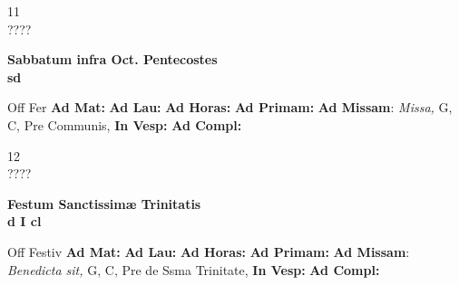\documentclass[10pt, openany]{book}
\begin{document}
    \begin{center}
        \begin{minipage}{3.5in}
            \vspace{2em}
            \begin{minipage}{0.5in}
                {\Huge 11} \\
                {\normalsize ????}
            \end{minipage}
            \begin{minipage}{3.0in}
                \textbf{ \large Sabbatum infra Oct. Pentecostes \\
                \textnormal{\normalsize sd}}

            \end{minipage}
            \begin{justify}Off Fer
                \textbf{Ad Mat: }
                \textbf{Ad Lau: }
                \textbf{Ad Horas: }
                \textbf{Ad Primam: }\textbf{Ad Missam}: \textit{Missa,} G, C, Pre Communis, 
                \textbf{In Vesp: }
                \textbf{Ad Compl: }
            \end{justify}
        \end{minipage}
    \end{center}

    \begin{center}
        \begin{minipage}{3.5in}
            \vspace{2em}
            \begin{minipage}{0.5in}
                {\Huge 12} \\
                {\normalsize ????}
            \end{minipage}
            \begin{minipage}{3.0in}
                \textbf{ \large Festum Sanctissimæ Trinitatis \\
                \textnormal{\normalsize d I cl}}

            \end{minipage}
            \begin{justify}Off Festiv
                \textbf{Ad Mat: }
                \textbf{Ad Lau: }
                \textbf{Ad Horas: }
                \textbf{Ad Primam: }\textbf{Ad Missam}: \textit{Benedicta sit,} G, C, Pre de Ssma Trinitate, 
                \textbf{In Vesp: }
                \textbf{Ad Compl: }
            \end{justify}
        \end{minipage}
    \end{center}
\end{document}
